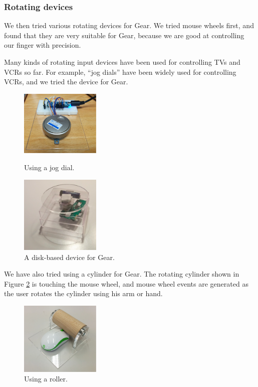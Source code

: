 \documentclass[conference]{IEEEtran}
\begin{document}
\subsubsection{Rotating devices}

We then tried various rotating devices for Gear.
%
We tried mouse wheels first, and found that they are very suitable for Gear,
because we are good at controlling our finger with precision.

Many kinds of rotating input devices have been used for controlling TVs and VCRs so far.
For example, ``jog dials'' have been widely used for controlling VCRs, and we tried the device for Gear.


\begin{figure}[H]
  \begin{minipage}{0.49\hsize}
    \centerline{\includegraphics[width=38mm,bb=0 0 1324 1095]{figures/7a2c685b930cd30a267f4d564a8079be.png}}
    \caption{Using a jog dial.}
    \label{jog}
  \end{minipage}
  \begin{minipage}{0.49\hsize}
    \centerline{\includegraphics[width=38mm,bb=0 0 362 354]{figures/ff2d18e66f9a4655dbb5e22e0bb9a0ae.png}}
    \caption{A disk-based device for Gear.}
    \label{disk}
  \end{minipage}
\end{figure}

We have also tried using a cylinder for Gear.
The rotating cylinder shown in Figure \ref{roller} is touching the mouse wheel, and
mouse wheel events are generated as the user rotates the cylinder using his arm or hand.

\begin{figure}[H]
  \centerline{\includegraphics[width=38mm,bb=0 0 1132 1039]{figures/6ff91502ea4f3f3c47840c887148ada9.png}}
  \caption{Using a roller.}
  \label{roller}
\end{figure}
\end{document}
